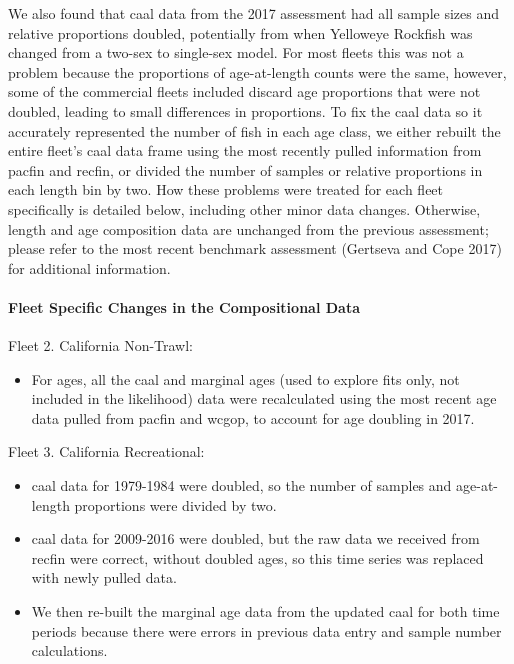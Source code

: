 \documentclass[
]{scrartcl}
\let\oldparagraph\paragraph
\renewcommand{\paragraph}[1]{\oldparagraph{#1}\mbox{}}
\providecommand{\tightlist}{%
  \setlength{\itemsep}{0pt}\setlength{\parskip}{0pt}}\usepackage{longtable,booktabs,array}
\begin{document}
We also found that \gls{caal} data from the 2017 assessment had all
sample sizes and relative proportions doubled, potentially from when
Yelloweye Rockfish was changed from a two-sex to single-sex model. For
most fleets this was not a problem because the proportions of
age-at-length counts were the same, however, some of the commercial
fleets included discard age proportions that were not doubled, leading
to small differences in proportions. To fix the \gls{caal} data so it
accurately represented the number of fish in each age class, we either
rebuilt the entire fleet's \gls{caal} data frame using the most recently
pulled information from \gls{pacfin} and \gls{recfin}, or divided the
number of samples or relative proportions in each length bin by two. How
these problems were treated for each fleet specifically is detailed
below, including other minor data changes. Otherwise, length and age
composition data are unchanged from the previous assessment; please
refer to the most recent benchmark assessment (Gertseva and Cope 2017)
for additional information.

\paragraph{Fleet Specific Changes in the Compositional
Data}\label{fleet-specific-changes-in-the-compositional-data}

Fleet 2. California Non-Trawl:

\begin{itemize}
\tightlist
\item
  For ages, all the \gls{caal} and marginal ages (used to explore fits
  only, not included in the likelihood) data were recalculated using the
  most recent age data pulled from \gls{pacfin} and \gls{wcgop}, to
  account for age doubling in 2017.
\end{itemize}

Fleet 3. California Recreational:

\begin{itemize}
\tightlist
\item
  \gls{caal} data for 1979-1984 were doubled, so the number of samples
  and age-at-length proportions were divided by two.
\item
  \gls{caal} data for 2009-2016 were doubled, but the raw data we
  received from \gls{recfin} were correct, without doubled ages, so this
  time series was replaced with newly pulled data.
\item
  We then re-built the marginal age data from the updated \gls{caal} for
  both time periods because there were errors in previous data entry and
  sample number calculations.
\end{itemize}
\end{document}
